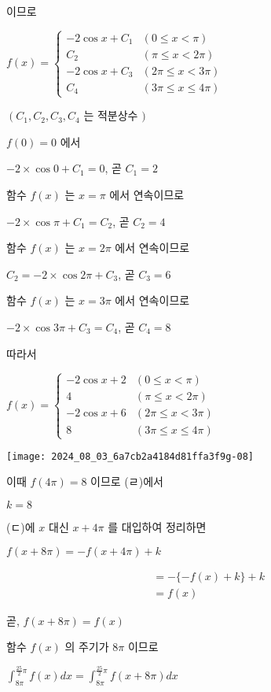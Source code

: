 \documentclass[10pt]{article}
\begin{document}
이므로

\(f(x)= \begin{cases}-2 \cos x+C_{1} & (0 \leq x<\pi) \\ C_{2} & (\pi \leq x<2 \pi) \\ -2 \cos x+C_{3} & (2 \pi \leq x<3 \pi) \\ C_{4} & (3 \pi \leq x \leq 4 \pi)\end{cases}\)

\(\left(C_{1}, C_{2}, C_{3}, C_{4}\right.\) 는 적분상수 \()\)

\(f(0)=0\) 에서

\(-2 \times \cos 0+C_{1}=0\), 곧 \(C_{1}=2\)

함수 \(f(x)\) 는 \(x=\pi\) 에서 연속이므로

\(-2 \times \cos \pi+C_{1}=C_{2}\), 곧 \(C_{2}=4\)

함수 \(f(x)\) 는 \(x=2 \pi\) 에서 연속이므로

\(C_{2}=-2 \times \cos 2 \pi+C_{3}\), 곧 \(C_{3}=6\)

함수 \(f(x)\) 는 \(x=3 \pi\) 에서 연속이므로

\(-2 \times \cos 3 \pi+C_{3}=C_{4}\), 곧 \(C_{4}=8\)

따라서

\(f(x)= \begin{cases}-2 \cos x+2 & (0 \leq x<\pi) \\ 4 & (\pi \leq x<2 \pi) \\ -2 \cos x+6 & (2 \pi \leq x<3 \pi) \\ 8 & (3 \pi \leq x \leq 4 \pi)\end{cases}\)

\begin{center}
\texttt{[image: 2024\_08\_03\_6a7cb2a4184d81ffa3f9g-08]}
\end{center}

이때 \(f(4 \pi)=8\) 이므로 (ㄹ)에서

\(k=8\)

(ㄷ)에 \(x\) 대신 \(x+4 \pi\) 를 대입하여 정리하면

\(f(x+8 \pi)=-f(x+4 \pi)+k\)

\[
\begin{aligned}
& =-\{-f(x)+k\}+k \\
& =f(x)
\end{aligned}
\]

곧, \(f(x+8 \pi)=f(x)\)

함수 \(f(x)\) 의 주기가 \(8 \pi\) 이므로

\(\int_{8 \pi}^{\frac{25}{2} \pi} f(x) d x=\int_{8 \pi}^{\frac{25}{2} \pi} f(x+8 \pi) d x\)
\end{document}

